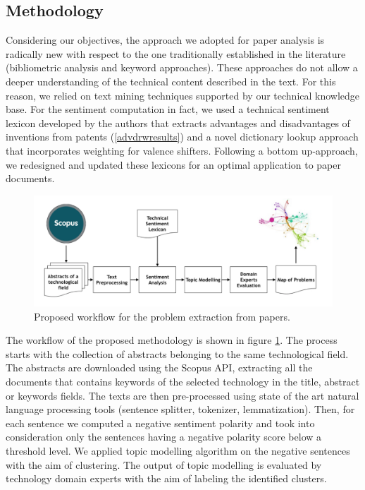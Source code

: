 \documentclass[]{book}
\begin{document}
\subsection{Methodology}\label{methodology-4}

Considering our objectives, the approach we adopted for paper analysis
is radically new with respect to the one traditionally established in
the literature (bibliometric analysis and keyword approaches). These
approaches do not allow a deeper understanding of the technical content
described in the text. For this reason, we relied on text mining
techniques supported by our technical knowledge base. For the sentiment
computation in fact, we used a technical sentiment lexicon developed by
the authors that extracts advantages and disadvantages of inventions
from patents (\ref{advdrwresults}) and a novel dictionary lookup
approach that incorporates weighting for valence shifters. Following a
bottom up-approach, we redesigned and updated these lexicons for an
optimal application to paper documents.

\begin{figure}

{\centering \includegraphics[width=0.8\linewidth]{_bookdown_files/figures/bcworkflow} 

}

\caption{Proposed workflow for the problem extraction from papers. }\label{fig:bcworkflow}
\end{figure}

The workflow of the proposed methodology is shown in figure
\ref{fig:bcworkflow}. The process starts with the collection of
abstracts belonging to the same technological field. The abstracts are
downloaded using the Scopus API, extracting all the documents that
contains keywords of the selected technology in the title, abstract or
keywords fields. The texts are then pre-processed using state of the art
natural language processing tools (sentence splitter, tokenizer,
lemmatization). Then, for each sentence we computed a negative sentiment
polarity and took into consideration only the sentences having a
negative polarity score below a threshold level. We applied topic
modelling algorithm on the negative sentences with the aim of
clustering. The output of topic modelling is evaluated by technology
domain experts with the aim of labeling the identified clusters.
\end{document}
